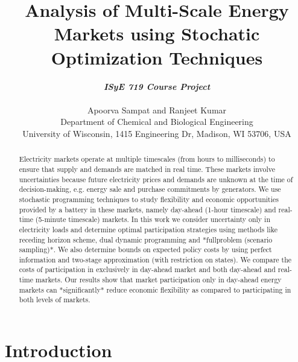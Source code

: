 \documentclass[11pt,twoside]{article}
\begin{document}
\title{Analysis of Multi-Scale Energy Markets using Stochatic Optimization Techniques}

\author{\textbf{\textit{ISyE 719 Course Project}}\\ \\Apoorva Sampat and Ranjeet Kumar\\
 {\small Department of Chemical and Biological Engineering}\\
 {\small \;University of Wisconsin, 1415 Engineering Dr, Madison, WI 53706, USA}}
\date{}
\maketitle

\begin{abstract}

Electricity markets operate at multiple timescales (from hours to milliseconds) to ensure that supply and demands are matched in real time. These markets involve uncertainties because future electricity prices and demands are unknown at the time of decision-making, e.g. energy sale and purchase commitments by generators. We use stochastic programming techniques to study flexibility and economic opportunities provided by a battery in these markets, namely day-ahead (1-hour timescale) and real-time (5-minute timescale) markets. In this work we consider uncertainty only in electricity loads and determine optimal participation strategies using methods like receding horizon scheme, dual dynamic programming and *fullproblem (scenario sampling)*. We also determine bounds on expected policy costs by using perfect information and two-stage approximation (with restriction on states). We compare the costs of participation in exclusively in day-ahead market and both day-ahead and real-time markets. Our results show that market participation only in day-ahead energy markets can *significantly* reduce economic flexibility as compared to participating in both levels of markets.
\end{abstract}


\section{Introduction}
\end{document}
